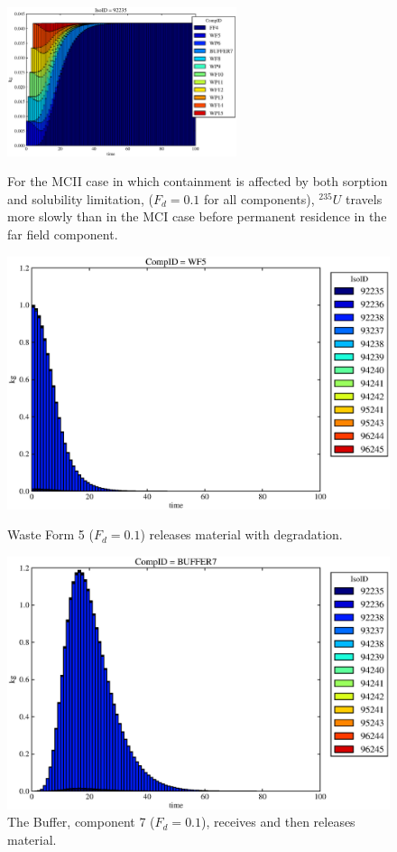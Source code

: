 \begin{figure}[ht]
\centering
\includegraphics[width=0.6\textwidth]{./chapters/demonstration/base/mcIII.eps}
\caption[$^{235}U$ residence. Mixed Cell Coupled Sorption and Solubility Limitation.]{
For the MCII case in which containment is affected by both sorption and solubility limitation, 
($F_{d}=0.1$ for all components), $^{235}U$ travels more slowly than in the MCI case 
before permanent residence in the far field component.
}
\label{fig:mcIIIall}
\begin{minipage}[b]{0.45\linewidth}

  \includegraphics[width=\textwidth]{./chapters/demonstration/base/mcIII1.eps}
  \caption[Case MCII Waste Form Contaminants.]{
    Waste Form 5 ($F_d = 0.1$) releases material with degradation. 
    }
  \label{fig:mcIIIwf5}
  
  \includegraphics[width=\textwidth]{./chapters/demonstration/base/mcIII3.eps}
  \caption[Case MCII Buffer Contaminants]{
    The Buffer, component 7 ($F_d=0.1$), receives and then releases material.
    }
  \label{fig:mcIIIbuff}


\end{minipage}
\end{figure}
